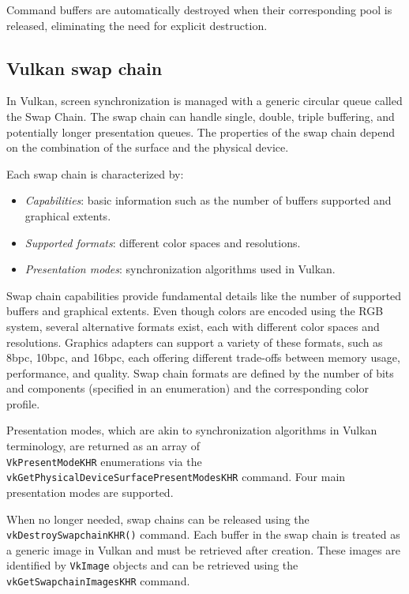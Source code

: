 Command buffers are automatically destroyed when their corresponding pool is released, eliminating the need for explicit destruction.

\subsection{Vulkan swap chain}
In Vulkan, screen synchronization is managed with a generic circular queue called the Swap Chain. 
The swap chain can handle single, double, triple buffering, and potentially longer presentation queues. 
The properties of the swap chain depend on the combination of the surface and the physical device.

Each swap chain is characterized by:
\begin{itemize}
    \item \textit{Capabilities}: basic information such as the number of buffers supported and graphical extents.
    \item \textit{Supported formats}: different color spaces and resolutions.
    \item \textit{Presentation modes}: synchronization algorithms used in Vulkan.
\end{itemize}

Swap chain capabilities provide fundamental details like the number of supported buffers and graphical extents. 
Even though colors are encoded using the RGB system, several alternative formats exist, each with different color spaces and resolutions. 
Graphics adapters can support a variety of these formats, such as 8bpc, 10bpc, and 16bpc, each offering different trade-offs between memory usage, performance, and quality. 
Swap chain formats are defined by the number of bits and components (specified in an enumeration) and the corresponding color profile.

Presentation modes, which are akin to synchronization algorithms in Vulkan terminology, are returned as an array of \\\texttt{VkPresentModeKHR} enumerations via the \\\texttt{vkGetPhysicalDeviceSurfacePresentModesKHR} command. 
Four main presentation modes are supported.

When no longer needed, swap chains can be released using the \texttt{vkDestroySwapchainKHR()} command. 
Each buffer in the swap chain is treated as a generic image in Vulkan and must be retrieved after creation.
 These images are identified by \texttt{VkImage} objects and can be retrieved using the \texttt{vkGetSwapchainImagesKHR} command.

